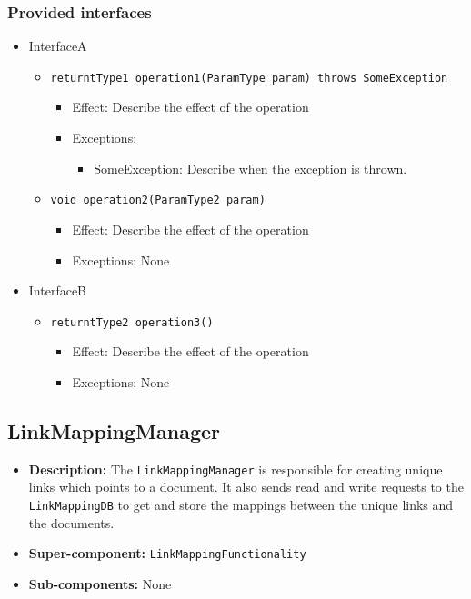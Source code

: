 \documentclass[a4paper,10pt]{article}
\begin{document}
\subsubsection*{Provided interfaces}
\begin{itemize}
    \item InterfaceA
    \begin{itemize}
        \item \texttt{returntType1 operation1(ParamType param) throws SomeException}
        \begin{itemize}
            \item Effect: Describe the effect of the operation
            \item Exceptions:
            \begin{itemize}
                \item SomeException: Describe when the exception is thrown.
            \end{itemize}
		\end{itemize}
        \item \texttt{void operation2(ParamType2 param)}
        \begin{itemize}
            \item Effect: Describe the effect of the operation
            \item Exceptions: None
        \end{itemize}
    \end{itemize}

    \item InterfaceB
    \begin{itemize}
        \item \texttt{returntType2 operation3()}
        \begin{itemize}
            \item Effect: Describe the effect of the operation
            \item Exceptions: None
        \end{itemize}
    \end{itemize}
\end{itemize}

\subsection{LinkMappingManager}
\begin{itemize}
    \item \textbf{Description:} The \texttt{LinkMappingManager} is responsible for creating unique links which points to a document. It also sends read and write requests to the \texttt{LinkMappingDB} to get and store the mappings between the unique links and the documents.
    \item \textbf{Super-component:} \texttt{LinkMappingFunctionality}
    \item \textbf{Sub-components:} None
\end{itemize}
\end{document}
